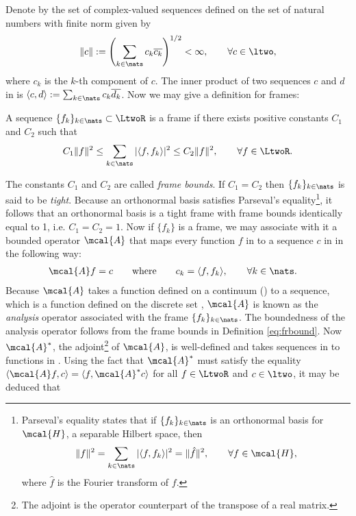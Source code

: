 \documentclass[a4paper, 12pt]{article}
\begin{document}
 Denote by \ltwo the set of  complex-valued sequences defined on the set of natural numbers \nats with finite norm given by 
 \begin{align}
   \Vert c \Vert := \left( \sum_{k \in \nats} c_k \overline{c_k} \right)^{1/2} <   \infty, \qquad \forall c \in \ltwo,\notag
   \label{}
 \end{align}
 where $c_k$ is the $k$-th component of $c$. The inner product of two sequences $c$ and $d$ in \ltwo is $\langle c, d \rangle := \sum_{k \in \nats} c_k \overline{d_k}$. Now we may give a definition for frames:
\begin{defn}\label{eq:frbound}
   A sequence $\{f_k\}_{k \in \nats} \subset \LtwoR$ is a frame if there exists positive constants $C_1$ and $C_2$ such that
  \begin{align}
    C_1\Vert f \Vert^2 \le \sum_{k \in \nats}\vert \langle f, f_k\rangle \vert^2 \le  C_2 \Vert f \Vert^2,
  \qquad  \forall f \in \LtwoR. \notag 
  \end{align}
\end{defn}
\noindent The  constants $C_1$ and $C_2$ are called   \emph{frame bounds}. If $C_1 = C_2$ then $\{f_k \}_{k \in \nats}$ is said to be \emph{tight}. Because an  orthonormal basis satisfies  Parseval's equality\footnote{
  Parseval's equality states that if $\{f_k\}_{k \in \nats}$ is an orthonormal basis for $\mcal{H}$, a separable Hilbert space, then
  \begin{align}
    \Vert f \Vert^2 = \sum_{k \in \nats} \vert \langle f, f_k \rangle \vert^2 =\Vert \hat{f} \Vert^2, \qquad \forall f \in \mcal{H},  \notag
    \label{}
  \end{align}
  where $\hat{f}$ is the Fourier transform of $f$.
}, it follows that an orthonormal basis is a tight frame with frame bounds identically equal to 1, i.e. $C_1 = C_2 = 1$.  Now if $\{f_k\}$ is a frame, we may associate with it a bounded operator $\mcal{A}$ that maps every function  $f$ in  \LtwoR to a sequence $c$ in \ltwo in the following way:
\begin{align}
  &\mcal{A} f  = c \qquad \text{where} \qquad c_k = \langle f, f_k\rangle, \qquad \forall k \in \nats. 
  \label{eq:analysis}
\end{align}
Because $\mcal{A}$ takes a function defined on a continuum (\real) to a sequence, which is a function defined on the discrete set \nats, $\mcal{A}$ is known as the \emph{analysis} operator associated with the frame $\{f_k\}_{k \in \nats}$. The boundedness of the analysis operator follows from the frame bounds in  Definition \eqref{eq:frbound}. Now $\mcal{A}^*$, the adjoint\footnote{The adjoint is the operator counterpart of the transpose of a real matrix.}  of $\mcal{A}$, is well-defined and takes sequences in \ltwo to functions in \LtwoR.  Using the fact that  $\mcal{A}^*$ must satisfy the equality $\langle \mcal{A} f  , c\rangle = \langle f,\mcal{A}^*c\rangle$ for all $f \in \LtwoR$ and $c \in \ltwo$, it may be deduced that
\end{document}
